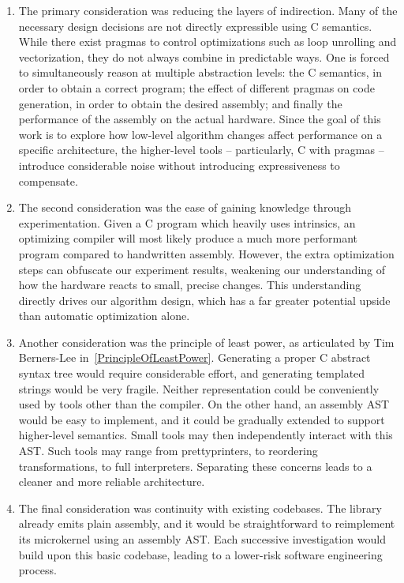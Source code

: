 \begin{enumerate}

\item The primary consideration was reducing the layers of indirection. Many of the necessary design decisions are not directly expressible using C semantics. While there exist pragmas to control optimizations such as loop unrolling and vectorization, they do not always combine in predictable ways. One is forced to simultaneously reason at multiple abstraction levels: the C semantics, in order to obtain a correct program; the effect of different pragmas on code generation, in order to obtain the desired assembly; and finally the performance of the assembly on the actual hardware. Since the goal of this work is to explore how low-level algorithm changes affect performance on a specific architecture, the higher-level tools -- particularly, C with pragmas -- introduce considerable noise without introducing expressiveness to compensate.

\item The second consideration was the ease of gaining knowledge through experimentation. Given a C program which heavily uses intrinsics, an optimizing compiler will most likely produce a much more performant program compared to handwritten assembly. However, the extra optimization steps can obfuscate our experiment results, weakening our understanding of how the hardware reacts to small, precise changes. This understanding directly drives our algorithm design, which has a far greater potential upside than automatic optimization alone.

\item Another consideration was the principle of least power, as articulated by Tim Berners-Lee in~\ref{PrincipleOfLeastPower}. Generating a proper C abstract syntax tree would require considerable effort, and generating templated strings would be very fragile. Neither representation could be conveniently used by tools other than the compiler. On the other hand, an assembly AST would be easy to implement, and it could be gradually extended to support higher-level semantics. Small tools may then independently interact with this AST. Such tools may range from prettyprinters, to reordering transformations, to full interpreters. Separating these concerns leads to a cleaner and more reliable architecture.

\item The final consideration was continuity with existing codebases. The  library already emits plain assembly, and it would be straightforward to reimplement its microkernel using an assembly AST. Each successive investigation would build upon this basic codebase, leading to a lower-risk software engineering process.

\end{enumerate}

